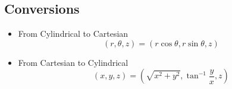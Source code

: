 \subsection{Conversions}
\noindent
\begin{itemize}
	\item From Cylindrical to Cartesian
		\begin{equation*}
			(r, \theta, z) = (r\cos{\theta}, r\sin{\theta}, z)
		\end{equation*}
	\item From Cartesian to Cylindrical
		\begin{equation*}
			(x, y, z)=\left(\sqrt{x^2 + y^2}, \tan^{-1}{\frac{y}{x}}, z\right)
		\end{equation*}
\end{itemize}
